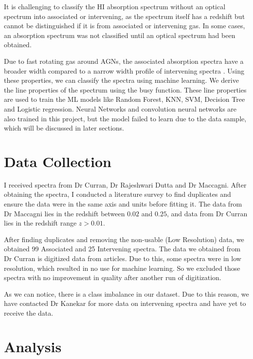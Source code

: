 \documentclass[10pt,twocolumn,letterpaper]{article}
\begin{document}
It is challenging to classify the HI absorption spectrum without an optical spectrum into associated or intervening, as the spectrum itself has a redshift but cannot be distinguished if it is from associated or intervening gas. In some cases, an absorption spectrum was not classified until an optical spectrum had been obtained\cite{5}.

Due to fast rotating gas around AGNs, the associated absorption spectra have a broader width \cite{6} compared to a narrow width profile of intervening spectra \cite{7}. Using these properties, we can classify the spectra using machine learning. We derive the line properties of the spectrum using the busy function\cite{8}. These line properties are used to train the ML models like Random Forest, KNN, SVM, Decision Tree and Logistic regression. Neural Networks and convolution neural networks are also trained in this project, but the model failed to learn due to the data sample, which will be discussed in later sections.


\section{Data Collection}

I received spectra from Dr Curran\cite{9}, Dr Rajeshwari Dutta\cite{10, 11, 12} and Dr Maccagni\cite{13}. After obtaining the spectra, I conducted a literature survey to find duplicates and ensure the data were in the same axis and units before fitting it. The data from Dr Maccagni lies in the redshift between $0.02$ and $0.25$, and data from Dr Curran lies in the redshift range $z > 0.01$. 

After finding duplicates and removing the non-usable (Low Resolution) data, we obtained 99 Associated and 25 Intervening spectra. The data we obtained from Dr Curran is digitized data from articles. Due to this, some spectra were in low resolution, which resulted in no use for machine learning. So we excluded those spectra with no improvement in quality after another run of digitization.

As we can notice, there is a class imbalance in our dataset. Due to this reason, we have contacted Dr Kanekar for more data on intervening spectra and have yet to receive the data.

\section{Analysis}
\end{document}
